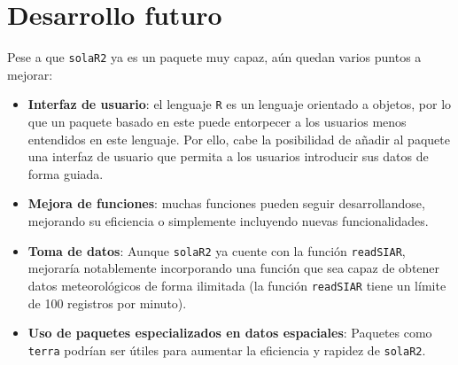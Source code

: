 \section{Desarrollo futuro}
\label{sec:org7e30a1f}
Pese a que \texttt{solaR2} ya es un paquete muy capaz, aún quedan varios puntos a mejorar:
\begin{itemize}
\item \textbf{Interfaz de usuario}: el lenguaje \texttt{R} es un lenguaje orientado a objetos, por lo que un paquete basado en este puede entorpecer a los usuarios menos entendidos en este lenguaje. Por ello, cabe la posibilidad de añadir al paquete una interfaz de usuario que permita a los usuarios introducir sus datos de forma guiada.
\item \textbf{Mejora de funciones}: muchas funciones pueden seguir desarrollandose, mejorando su eficiencia o simplemente incluyendo nuevas funcionalidades.
\item \textbf{Toma de datos}: Aunque \texttt{solaR2} ya cuente con la función \texttt{readSIAR}, mejoraría notablemente incorporando una función que sea capaz de obtener datos meteorológicos de forma ilimitada (la función \texttt{readSIAR} tiene un límite de 100 registros por minuto).
\item \textbf{Uso de paquetes especializados en datos espaciales}: Paquetes como \texttt{terra} \cite{hijmans24} podrían ser útiles para aumentar la eficiencia y rapidez de \texttt{solaR2}.
\end{itemize}
